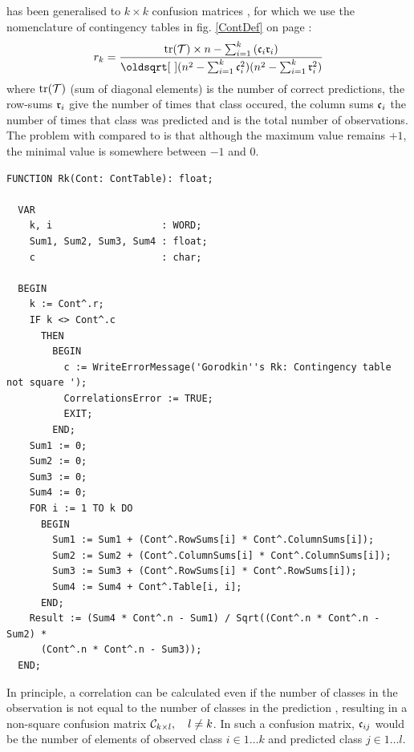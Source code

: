 \begin{refsection}
 has been generalised to \( k \times k \) confusion matrices \parencite{Gor-04}, for which we use the nomenclature of contingency tables in fig. \ref{ContDef} on page \pageref{ContDef}:
\begin{equation}
  r_k = \frac{\trace(\arr{T}) \times n - \sum_{i=1}^k{(\AbsVec{c}_{i} \AbsVec{r}_{i})}}{\sqrt{(n^2 - \sum_{i=1}^k{\AbsVec{c}_{i}^2}) (n^2 - \sum_{i=1}^k{\AbsVec{r}_{i}^2}) }}
\end{equation}
where \(\operatorname{tr}(\mathcal{T}) \) (sum of diagonal elements) is the number of correct predictions, the row-sums \( \mathfrak{r}_{i} \) give the number of times that class  occured, the column sums \( \mathfrak{c}_{i} \) the number of times that class  was predicted and  is the total number of observations. The problem with  compared to  is that although the maximum value remains \(+1\), the minimal value is somewhere between \(-1\) and \num{0}.

\begin{lstlisting}[caption=\Name{Gorodkin}'s multi-class correlation \skalar{r_k}]
  FUNCTION Rk(Cont: ContTable): float;

  VAR
    k, i                   : WORD;
    Sum1, Sum2, Sum3, Sum4 : float;
    c                      : char;

  BEGIN
    k := Cont^.r;
    IF k <> Cont^.c
      THEN
        BEGIN
          c := WriteErrorMessage('Gorodkin''s Rk: Contingency table not square ');
          CorrelationsError := TRUE;
          EXIT;
        END;
    Sum1 := 0;
    Sum2 := 0;
    Sum3 := 0;
    Sum4 := 0;
    FOR i := 1 TO k DO
      BEGIN
        Sum1 := Sum1 + (Cont^.RowSums[i] * Cont^.ColumnSums[i]);
        Sum2 := Sum2 + (Cont^.ColumnSums[i] * Cont^.ColumnSums[i]);
        Sum3 := Sum3 + (Cont^.RowSums[i] * Cont^.RowSums[i]);
        Sum4 := Sum4 + Cont^.Table[i, i];
      END;
    Result := (Sum4 * Cont^.n - Sum1) / Sqrt((Cont^.n * Cont^.n - Sum2) *
      (Cont^.n * Cont^.n - Sum3));
  END;
\end{lstlisting}

In principle, a correlation can be calculated even if the number of classes in the observation  is not equal to the number of classes in the prediction , resulting in a non-square confusion matrix \( \mathcal{C}_{k\times l},\quad l \neq k \). In such a confusion matrix, \( \mathfrak{c}_{ij} \) would be the number of elements of observed class \( i \in 1\ldots k\) and predicted class \( j \in 1\ldots l\).


\end{refsection}
